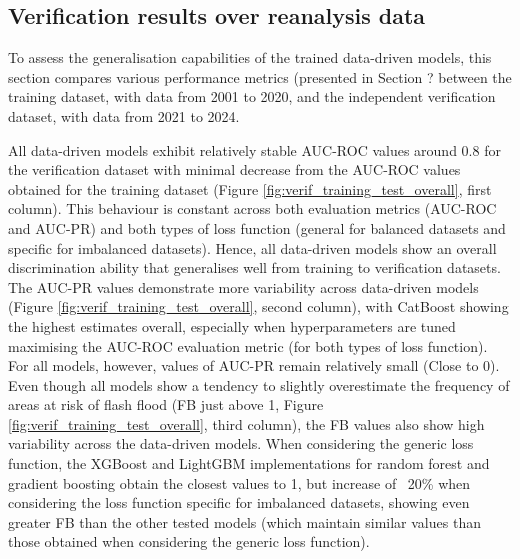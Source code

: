 \documentclass[nhess, manuscript]{copernicus}
\begin{document}
\subsection{Verification results over reanalysis data}

To assess the generalisation capabilities of the trained data-driven models, this section compares various performance metrics (presented in Section ? between the training dataset, with data from 2001 to 2020, and the independent verification dataset, with data from 2021 to 2024.

All data-driven models exhibit relatively stable AUC-ROC values around 0.8 for the verification dataset with minimal decrease from the AUC-ROC values obtained for the training dataset (Figure \ref{fig:verif_training_test_overall}, first column). This behaviour is constant across both evaluation metrics (AUC-ROC and AUC-PR) and both types of loss function (general for balanced datasets and specific for imbalanced datasets). Hence, all data-driven models show an overall discrimination ability that generalises well from training to verification datasets. The AUC-PR values demonstrate more variability across data-driven models (Figure \ref{fig:verif_training_test_overall}, second column), with CatBoost showing the highest estimates overall, especially when hyperparameters are tuned maximising the AUC-ROC evaluation metric (for both types of loss function). For all models, however, values of AUC-PR remain relatively small (Close to 0). Even though all models show a tendency to slightly overestimate the frequency of areas at risk of flash flood (FB just above 1, Figure \ref{fig:verif_training_test_overall}, third column), the FB values also show high variability across the data-driven models. When considering the generic loss function, the XGBoost and LightGBM implementations for random forest and gradient boosting obtain the closest values to 1, but increase of ~20\% when considering the loss function specific for imbalanced datasets, showing even greater FB than the other tested models (which maintain similar values than those obtained when considering the generic loss function).
\end{document}
